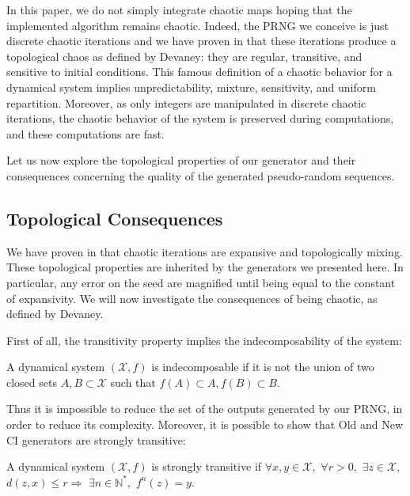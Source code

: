 \documentclass[journal]{IEEEtran}
\begin{document}
In this paper, we do not simply integrate chaotic maps hoping that the implemented algorithm remains chaotic. Indeed, the PRNG we conceive is just discrete chaotic iterations and we have proven in \cite{guyeux09} that these iterations produce a topological chaos as defined by Devaney: they are regular, transitive, and sensitive to initial conditions. This famous definition of a chaotic behavior for a dynamical system implies unpredictability, mixture, sensitivity, and uniform repartition. Moreover, as only integers are manipulated in discrete chaotic iterations, the chaotic behavior of the system is preserved during computations, and these computations are fast.

Let us now explore the topological properties of our generator and their consequences concerning the quality of the generated pseudo-random sequences.



\subsection{Topological Consequences}

We have proven in \cite{gfb10:ip} that chaotic iterations are expansive and topologically mixing. These topological properties are inherited by the generators we presented here. In particular, any error on the seed are magnified until being equal to the constant of expansivity.
We will now investigate the consequences of being chaotic, as defined by Devaney. 

First of all, the transitivity property implies the indecomposability of the system:

\begin{definition}
A dynamical system $\left( \mathcal{X}, f\right)$ is indecomposable if it is not the union of two closed sets $A, B \subset \mathcal{X}$ such that $f(A) \subset A, f(B) \subset B$.
\end{definition}

Thus it is impossible to reduce the set of the outputs generated by our PRNG, in order to reduce its complexity. Moreover, it is possible to show that Old and New CI generators are strongly transitive:

\begin{definition}
A dynamical system $\left( \mathcal{X}, f\right)$ is strongly transitive if $\forall x,y \in \mathcal{X},$ $\forall r > 0,$ $\exists z \in \mathcal{X},$ $d(z,x) \leqslant r \Rightarrow$ $\exists n \in \mathds{N}^*,$ $f^n(z)=y$.
\end{definition}
\end{document}

